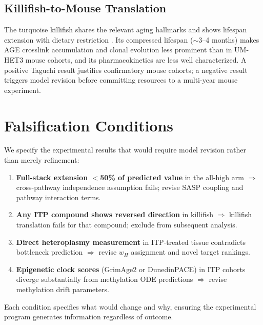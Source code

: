 \documentclass[11pt]{article}
\begin{document}
\subsection{Killifish-to-Mouse Translation}

The turquoise killifish shares the relevant aging hallmarks and shows lifespan extension with dietary restriction \citep{Terzibasi2008}. Its compressed lifespan ($\sim$3--4 months) makes AGE crosslink accumulation and clonal evolution less prominent than in UM-HET3 mouse cohorts, and its pharmacokinetics are less well characterized. A positive Taguchi result justifies confirmatory mouse cohorts; a negative result triggers model revision before committing resources to a multi-year mouse experiment.

\section{Falsification Conditions}

We specify the experimental results that would require model revision rather than merely refinement:

\begin{enumerate}
\item \textbf{Full-stack extension $<$50\% of predicted value} in the all-high arm $\Rightarrow$ cross-pathway independence assumption fails; revise SASP coupling and pathway interaction terms.

\item \textbf{Any ITP compound shows reversed direction} in killifish $\Rightarrow$ killifish translation fails for that compound; exclude from subsequent analysis.

\item \textbf{Direct heteroplasmy measurement} in ITP-treated tissue contradicts bottleneck prediction $\Rightarrow$ revise $w_H$ assignment and novel target rankings.

\item \textbf{Epigenetic clock scores} (GrimAge2 or DunedinPACE) in ITP cohorts diverge substantially from methylation ODE predictions $\Rightarrow$ revise methylation drift parameters.
\end{enumerate}

Each condition specifies what would change and why, ensuring the experimental program generates information regardless of outcome.




\end{document}
